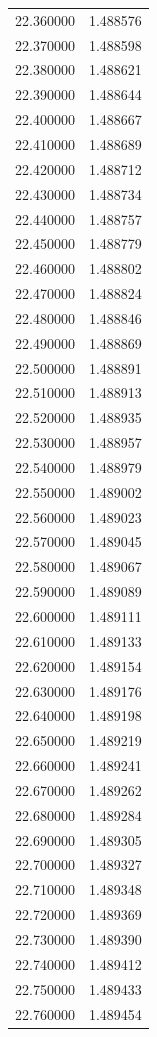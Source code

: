 \begin{tabular}{rr}
22.360000 & 1.488576 \\
22.370000 & 1.488598 \\
22.380000 & 1.488621 \\
22.390000 & 1.488644 \\
22.400000 & 1.488667 \\
22.410000 & 1.488689 \\
22.420000 & 1.488712 \\
22.430000 & 1.488734 \\
22.440000 & 1.488757 \\
22.450000 & 1.488779 \\
22.460000 & 1.488802 \\
22.470000 & 1.488824 \\
22.480000 & 1.488846 \\
22.490000 & 1.488869 \\
22.500000 & 1.488891 \\
22.510000 & 1.488913 \\
22.520000 & 1.488935 \\
22.530000 & 1.488957 \\
22.540000 & 1.488979 \\
22.550000 & 1.489002 \\
22.560000 & 1.489023 \\
22.570000 & 1.489045 \\
22.580000 & 1.489067 \\
22.590000 & 1.489089 \\
22.600000 & 1.489111 \\
22.610000 & 1.489133 \\
22.620000 & 1.489154 \\
22.630000 & 1.489176 \\
22.640000 & 1.489198 \\
22.650000 & 1.489219 \\
22.660000 & 1.489241 \\
22.670000 & 1.489262 \\
22.680000 & 1.489284 \\
22.690000 & 1.489305 \\
22.700000 & 1.489327 \\
22.710000 & 1.489348 \\
22.720000 & 1.489369 \\
22.730000 & 1.489390 \\
22.740000 & 1.489412 \\
22.750000 & 1.489433 \\
22.760000 & 1.489454 \\

\end{tabular}
